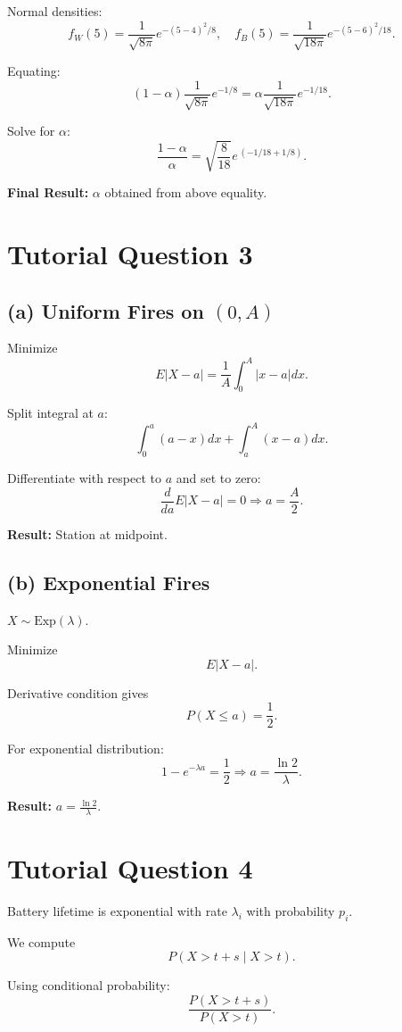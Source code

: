 \documentclass[12pt]{article}
\begin{document}
Normal densities:
\[
f_W(5)=\frac{1}{\sqrt{8\pi}}
e^{-(5-4)^2/8},
\quad
f_B(5)=\frac{1}{\sqrt{18\pi}}
e^{-(5-6)^2/18}.
\]

Equating:
\[
(1-\alpha)\frac{1}{\sqrt{8\pi}}e^{-1/8}
=\alpha\frac{1}{\sqrt{18\pi}}e^{-1/18}.
\]

Solve for $\alpha$:
\[
\frac{1-\alpha}{\alpha}
=\sqrt{\frac{8}{18}}
e^{\,(-1/18+1/8)}.
\]

\textbf{Final Result:} $\alpha$ obtained from above equality.

\section*{Tutorial Question 3}

\subsection*{(a) Uniform Fires on $(0,A)$}

Minimize
\[
E|X-a|=\frac1A\int_0^A |x-a|dx.
\]

Split integral at $a$:
\[
\int_0^a (a-x)dx+\int_a^A(x-a)dx.
\]

Differentiate with respect to $a$ and set to zero:
\[
\frac{d}{da}E|X-a|=0
\Rightarrow a=\frac{A}{2}.
\]

\textbf{Result:} Station at midpoint.

\subsection*{(b) Exponential Fires}

$X\sim \text{Exp}(\lambda)$.

Minimize
\[
E|X-a|.
\]

Derivative condition gives
\[
P(X\le a)=\frac12.
\]

For exponential distribution:
\[
1-e^{-\lambda a}=\frac12
\Rightarrow a=\frac{\ln 2}{\lambda}.
\]

\textbf{Result:} $\boxed{a=\frac{\ln 2}{\lambda}}$.

\section*{Tutorial Question 4}

Battery lifetime is exponential with rate $\lambda_i$ with probability $p_i$.

We compute
\[
P(X>t+s\mid X>t).
\]

Using conditional probability:
\[
\frac{P(X>t+s)}{P(X>t)}.
\]
\end{document}
